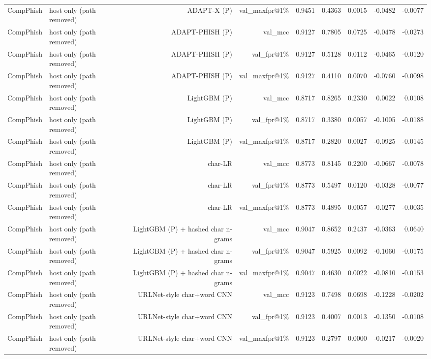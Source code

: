 \begin{table}[t]
\begin{tabular}{llrrrrrrr}
CompPhish & host only (path removed) & ADAPT-X (P) & val\_maxfpr@1\% & 0.9451 & 0.4363 & 0.0015 & -0.0482 & -0.0077 \\
CompPhish & host only (path removed) & ADAPT-PHISH (P) & val\_mcc & 0.9127 & 0.7805 & 0.0725 & -0.0478 & -0.0273 \\
CompPhish & host only (path removed) & ADAPT-PHISH (P) & val\_fpr@1\% & 0.9127 & 0.5128 & 0.0112 & -0.0465 & -0.0120 \\
CompPhish & host only (path removed) & ADAPT-PHISH (P) & val\_maxfpr@1\% & 0.9127 & 0.4110 & 0.0070 & -0.0760 & -0.0098 \\
CompPhish & host only (path removed) & LightGBM (P) & val\_mcc & 0.8717 & 0.8265 & 0.2330 & 0.0022 & 0.0108 \\
CompPhish & host only (path removed) & LightGBM (P) & val\_fpr@1\% & 0.8717 & 0.3380 & 0.0057 & -0.1005 & -0.0188 \\
CompPhish & host only (path removed) & LightGBM (P) & val\_maxfpr@1\% & 0.8717 & 0.2820 & 0.0027 & -0.0925 & -0.0145 \\
CompPhish & host only (path removed) & char-LR & val\_mcc & 0.8773 & 0.8145 & 0.2200 & -0.0667 & -0.0078 \\
CompPhish & host only (path removed) & char-LR & val\_fpr@1\% & 0.8773 & 0.5497 & 0.0120 & -0.0328 & -0.0077 \\
CompPhish & host only (path removed) & char-LR & val\_maxfpr@1\% & 0.8773 & 0.4895 & 0.0057 & -0.0277 & -0.0035 \\
CompPhish & host only (path removed) & LightGBM (P) + hashed char n-grams & val\_mcc & 0.9047 & 0.8652 & 0.2437 & -0.0363 & 0.0640 \\
CompPhish & host only (path removed) & LightGBM (P) + hashed char n-grams & val\_fpr@1\% & 0.9047 & 0.5925 & 0.0092 & -0.1060 & -0.0175 \\
CompPhish & host only (path removed) & LightGBM (P) + hashed char n-grams & val\_maxfpr@1\% & 0.9047 & 0.4630 & 0.0022 & -0.0810 & -0.0153 \\
CompPhish & host only (path removed) & URLNet-style char+word CNN & val\_mcc & 0.9123 & 0.7498 & 0.0698 & -0.1228 & -0.0202 \\
CompPhish & host only (path removed) & URLNet-style char+word CNN & val\_fpr@1\% & 0.9123 & 0.4007 & 0.0013 & -0.1350 & -0.0108 \\
CompPhish & host only (path removed) & URLNet-style char+word CNN & val\_maxfpr@1\% & 0.9123 & 0.2797 & 0.0000 & -0.0217 & -0.0020 \\

\end{tabular}
\end{table}
